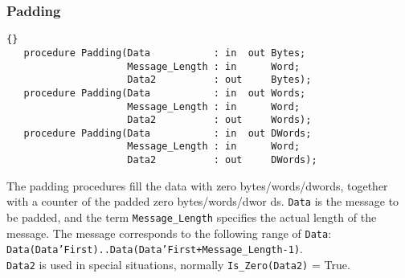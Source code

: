 \subsubsection{Padding}
\begin{lstlisting}{}
   procedure Padding(Data           : in  out Bytes;
                     Message_Length : in      Word;
                     Data2          : out     Bytes);
   procedure Padding(Data           : in  out Words;
                     Message_Length : in      Word;
                     Data2          : out     Words);
   procedure Padding(Data           : in  out DWords;
                     Message_Length : in      Word;
                     Data2          : out     DWords);
\end{lstlisting}
The padding procedures fill the data with zero bytes/words/dwords,
together with a counter of the padded zero bytes/words/dwor
ds. \texttt{Data} is the message to be padded, and the term
\texttt{Message\_Length} specifies the actual length of the
message. The message corresponds to the following range of
\texttt{Data}: \texttt{Data(Data'First)..Data(Data'First+Message\_Length-1)}. \\
\texttt{Data2} is used in special situations, normally \texttt{Is\_Zero(Data2)} = True.

